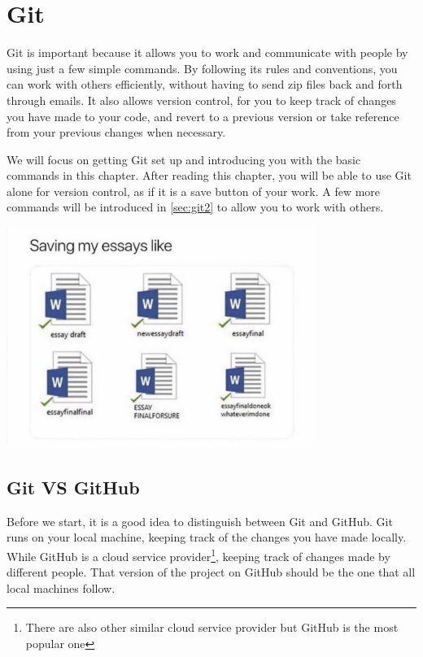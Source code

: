 \chapter{Git}
\label{sec:ch3}

Git is important because it allows you to work and communicate with people by using just a few simple commands. By following its rules and conventions, you can work with others efficiently, without having to send zip files back and forth through emails. It also allows version control, for you to keep track of changes you have made to your code, and revert to a previous version or take reference from your previous changes when necessary.
\vspace{6mm}

We will focus on getting Git set up and introducing you with the basic commands in this chapter. After reading this chapter, you will be able to use Git alone for version control, as if it is a save button of your work. A few more commands will be introduced in \cref{sec:git2} to allow you to work with others.

\begin{center}
\includegraphics[width=10cm]{images/ch0-version-control.jpeg}
\end{center}

\section{Git VS GitHub}

Before we start, it is a good idea to distinguish between Git and GitHub. Git runs on your local machine, keeping track of the changes you have made locally. While GitHub is a cloud service provider\footnote{There are also other similar cloud service provider but GitHub is the most popular one}, keeping track of changes made by different people. That version of the project on GitHub should be the one that all local machines follow.

